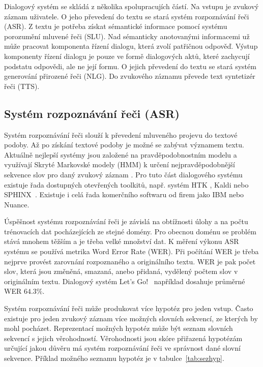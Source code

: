 Dialogový systém se skládá z několika spolupracujích částí.
Na vstupu je zvukový záznam uživatele.
O jeho převedení do textu se stará systém rozpoznávání řeči (ASR).
Z textu je potřeba získat sémantické informace pomocí systému porozumění mluvené řeči (SLU).
Nad sémanticky anotovanými informacemi už může pracovat komponenta řízení dialogu, která zvolí patřičnou odpověď.
Výstup komponenty řízení dialogu je pouze ve formě dialogových aktů, které zachycují podstatu odpovědi, ale ne její formu.
O jejich převedení do textu se stará systém generování přirozené řeči (NLG).
Do zvukového záznamu převede text syntetizér řeči (TTS).

\subsection{Systém rozpoznávání řeči (ASR)}

Systém rozpoznávání řeči slouží k převedení mluveného projevu do textové podoby.
Až po získání textové podoby je možné se zabývat významem textu.
Aktuálně nejlepší systémy jsou založené na pravděpodobnostním modelu a využívají Skryté Markovské modely (HMM) k určení nejpravděpodobnější sekvence slov pro daný zvukový záznam \cite{juang1991hidden}.
Pro tuto část dialogového systému existuje řada dostupných otevřených toolkitů, např. systém HTK \cite{young2002htk}, Kaldi \cite{Povey_ASRU2011} nebo SPHINX~\cite{walker2004sphinx}.
Existuje i celá řada komerčního softwaru od firem jako IBM nebo Nuance.

Úspěšnost systému rozpoznávání řeči je závislá na obtížnosti úlohy a na počtu trénovacích dat pocházejících ze stejné domény.
Pro obecnou doménu se problém stává mnohem těžším a je třeba velké množství dat.
K měření výkonu ASR systému se používá metrika Word Error Rate (WER).
Při počítání WER je třeba nejprve provést zarovnání rozpoznaného a originálního textu.
WER je pak počet slov, která jsou změněná, smazaná, anebo přidaná, vydělený počtem slov v originálním textu.
Dialogový systém Let's Go!~\cite{raux2006doing} například dosahuje průměrné WER $64.3\%$.

Systém rozpoznávání řeči může produkovat více hypotéz pro jeden vstup.
Často existuje pro jeden zvukový záznam více možných slovních sekvencí, ze kterých by mohl pocházet.
Reprezentací možných hypotéz může být seznam slovních sekvencí s jejich věrohodností.
Věrohodnosti jsou skóre přiřazená hypotézám určující jakou důvěru má systém rozpoznávání řeči ve správnost dané slovní sekvence.
Příklad možného seznamu hypotéz je v tabulce~\ref{tab:sezhyp}.

